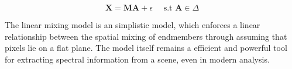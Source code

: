 \begin{equation}
    \label{lmm:abund-lmm-collection}
    \mathbf{X} = \mathbf{M} \mathbf{A} + \epsilon \quad \text{ s.t } \mathbf{A} \in \Delta
\end{equation}

The linear mixing model is an simplistic model, which enforces a linear relationship between the spatial mixing of endmembers through assuming that pixels lie on a flat plane. The model itself remains a efficient and powerful tool for extracting spectral information from a scene, even in modern analysis.